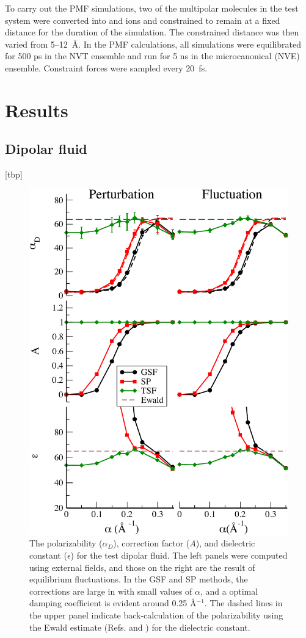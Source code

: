To carry out the PMF simulations, two of the multipolar molecules in
the test system were converted into  and  ions and
constrained to remain at a fixed distance for the duration of the
simulation. The constrained distance was then varied from 5--12~\AA.
In the PMF calculations, all simulations were equilibrated for 500 ps
in the NVT ensemble and run for 5 ns in the microcanonical (NVE)
ensemble.  Constraint forces were sampled every 20~fs.

\section{Results}
\subsection{Dipolar fluid}[tbp]
\begin{figure}
\begin{center}
\includegraphics[width=4.5in]{dielectricFinal_Dipole.pdf}
\caption{The polarizability ($\alpha_D$), correction factor ($A$), and
  dielectric constant ($\epsilon$) for the test dipolar fluid. The
  left panels were computed using external fields, and those on the
  right are the result of equilibrium fluctuations.  In the GSF and SP
  methods, the corrections are large in with small values of $\alpha$,
  and a optimal damping coefficient is evident around 0.25 \AA$^{-1}$.
  The dashed lines in the upper panel indicate back-calculation of the
  polarizability using the Ewald estimate (Refs.\cite{Adams81}
  and \cite{NeumannI83}) for the dielectric constant.}
\label{fig:dielectricDipole}
\end{center}
\end{figure}
